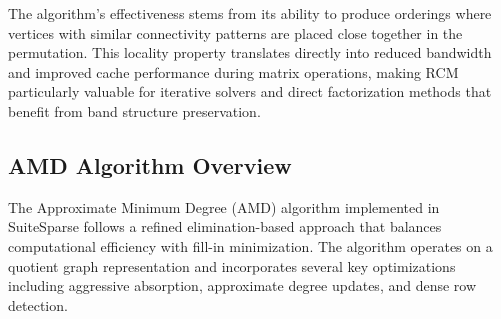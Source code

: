 The algorithm's effectiveness stems from its ability to produce orderings where vertices with similar connectivity patterns are placed close together in the permutation. This locality property translates directly into reduced bandwidth and improved cache performance during matrix operations, making RCM particularly valuable for iterative solvers and direct factorization methods that benefit from band structure preservation.

\subsection{AMD Algorithm Overview}

The Approximate Minimum Degree (AMD) algorithm implemented in SuiteSparse  \cite{davis_drtimothyaldendavissuitesparse_2025, noauthor_aldenmath_nodate, amestoy_algorithm_2004} follows a refined elimination-based approach that balances computational efficiency with fill-in minimization. The algorithm operates on a quotient graph representation and incorporates several key optimizations including aggressive absorption, approximate degree updates, and dense row detection.

